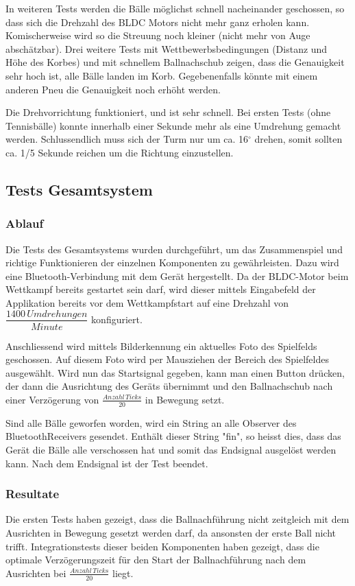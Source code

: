 \noindent
In weiteren Tests werden die Bälle möglichst schnell nacheinander geschossen, 
so dass sich die Drehzahl des BLDC Motors nicht mehr ganz erholen kann. 
Komischerweise wird so die Streuung noch kleiner (nicht mehr von Auge 
abschätzbar). Drei weitere Tests mit Wettbewerbsbedingungen (Distanz und Höhe 
des Korbes) und mit schnellem Ballnachschub zeigen, dass die Genauigkeit sehr 
hoch ist, alle Bälle landen im Korb. Gegebenenfalls könnte mit einem anderen 
Pneu die Genauigkeit noch erhöht werden.

\noindent
Die Drehvorrichtung funktioniert, und ist sehr schnell. Bei ersten Tests (ohne 
Tennisbälle) konnte innerhalb einer Sekunde mehr als eine Umdrehung gemacht 
werden. Schlussendlich muss sich der Turm nur um ca. 16$^\circ$ drehen, somit 
sollten ca. 1/5 Sekunde reichen um die Richtung einzustellen.



\subsection{Tests Gesamtsystem}
\subsubsection{Ablauf}
Die Tests des Gesamtsystems wurden durchgeführt, um das Zusammenspiel und 
richtige Funktionieren der einzelnen Komponenten zu gewährleisten. Dazu wird 
eine Bluetooth-Verbindung mit dem Gerät hergestellt. Da der BLDC-Motor beim 
Wettkampf bereits gestartet sein darf, wird dieser mittels Eingabefeld der 
Applikation bereits vor dem Wettkampfstart auf eine Drehzahl von 
$\dfrac{1400\,Umdrehungen}{Minute}$ konfiguriert.

\noindent
Anschliessend wird mittels Bilderkennung ein aktuelles Foto des Spielfelds 
geschossen. Auf diesem Foto wird per Mausziehen der Bereich des Spielfeldes 
ausgewählt. Wird nun das Startsignal gegeben, kann man einen Button drücken, 
der dann die Ausrichtung des Geräts übernimmt und den Ballnachschub nach einer 
Verzögerung von $\frac{Anzahl\,Ticks}{20}$ in Bewegung setzt.

\noindent
Sind alle Bälle geworfen worden, wird ein String an alle Observer des 
BluetoothReceivers gesendet. Enthält dieser String "fin", so heisst dies, dass 
das Gerät die Bälle alle verschossen hat und somit das Endsignal ausgelöst 
werden kann. Nach dem Endsignal ist der Test beendet.

\subsubsection{Resultate}
\noindent
Die ersten Tests haben gezeigt, dass die Ballnachführung nicht zeitgleich mit 
dem Ausrichten in Bewegung gesetzt werden darf, da ansonsten der erste Ball 
nicht trifft. Integrationstests dieser beiden Komponenten haben gezeigt, dass 
die optimale Verzögerungszeit für den Start der Ballnachführung nach dem 
Ausrichten bei $\frac{Anzahl\,Ticks}{20}$ liegt. 

